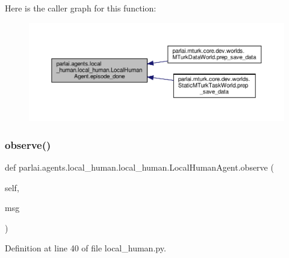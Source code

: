 Here is the caller graph for this function\+:
\nopagebreak
\begin{figure}[H]
\begin{center}
\leavevmode
\includegraphics[width=350pt]{classparlai_1_1agents_1_1local__human_1_1local__human_1_1LocalHumanAgent_a5c598c26dfd30db3120dac0cf02daf67_icgraph}
\end{center}
\end{figure}
\mbox{\label{classparlai_1_1agents_1_1local__human_1_1local__human_1_1LocalHumanAgent_aa204d28672d6580895d95aed167cb129}} 
\subsubsection{\texorpdfstring{observe()}{observe()}}
{\footnotesize\ttfamily def parlai.\+agents.\+local\+\_\+human.\+local\+\_\+human.\+Local\+Human\+Agent.\+observe (\begin{DoxyParamCaption}\item[{}]{self,  }\item[{}]{msg }\end{DoxyParamCaption})}



Definition at line 40 of file local\+\_\+human.\+py.



